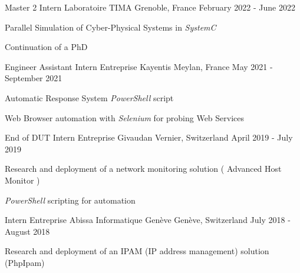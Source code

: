 

\begin{cventries}

  \cventry
    {Master 2 Intern} %
    {Laboratoire TIMA} %
    {Grenoble, France} %
    {February 2022 - June 2022} %
    {
      \begin{cvitems} %
        \item{Parallel Simulation of Cyber-Physical Systems in \emph{SystemC}}
        \item{Continuation of a PhD}
      \end{cvitems}
    }

  \cventry
    {Engineer Assistant Intern} %
    {Entreprise Kayentis} %
    {Meylan, France} %
    {May 2021 - September 2021} %
    {
      \begin{cvitems} %
        \item {Automatic Response System \emph{PowerShell} script}
        \item {Web Browser automation with \emph{Selenium} for probing Web Services}
      \end{cvitems}
    }

  \cventry
    {End of DUT Intern} %
    {Entreprise Givaudan} %
    {Vernier, Switzerland} %
    {April 2019 - July 2019} %
    {
      \begin{cvitems} %
        \item {Research and deployment of a network monitoring solution ( Advanced Host Monitor )}
        \item {\emph{PowerShell} scripting for automation}
      \end{cvitems}
    }
  
    \cventry
    {Intern} %
    {Entreprise Abissa Informatique Genève} %
    {Genève, Switzerland} %
    {July 2018 - August 2018} %
    {
      \begin{cvitems} %
        \item {Research and deployment of an IPAM (IP address management) solution (PhpIpam)}
      \end{cvitems}
    }
\end{cventries}
